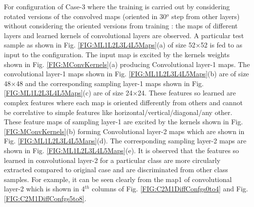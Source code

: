 For configuration of Case-3 where the training is carried out by considering rotated versions of the convolved maps (oriented in 30$^o$ step from other layers) without considering the oriented versions from training : the maps of different layers and learned kernels of convolutional layers are observed. A particular test sample as shown in Fig. \ref{FIG:ML1L2L3L4L5Maps}(a) of size 52$\times$52 is fed to as input to the configuration. The input map is excited by the kernels weights shown in Fig. \ref{FIG:MConvKernels}(a) producing Convolutional layer-1 maps. The convolutional layer-1 maps shown in Fig. \ref{FIG:ML1L2L3L4L5Maps}(b) are of size 48$\times$48 and the corresponding sampling layer-1 maps shown in Fig. \ref{FIG:ML1L2L3L4L5Maps}(c) are of size 24$ 
\times$24. These features so learned are complex features where each map is oriented differently from others and cannot be correlative to simple features like horizontal/vertical/diagonal/any other. These feature maps of sampling layer-1 are excited by the kernels shown in Fig. \ref{FIG:MConvKernels}(b) forming Convolutional layer-2 maps which are shown in Fig. \ref{FIG:ML1L2L3L4L5Maps}(d). The corresponding sampling layer-2 maps are shown in Fig. \ref{FIG:ML1L2L3L4L5Maps}(e). 
It is observed that the features so learned in convolutional layer-2 for a particular class are more circularly extracted compared to original case and are discriminated from other class samples. For example, it can be seen clearly from the map1 of convolutional layer-2 which is shown in 4$^{th}$ columns of Fig. \ref{FIG:C2M1DiffConfgs0to4} and Fig. \ref{FIG:C2M1DiffConfgs5to8}. \\


